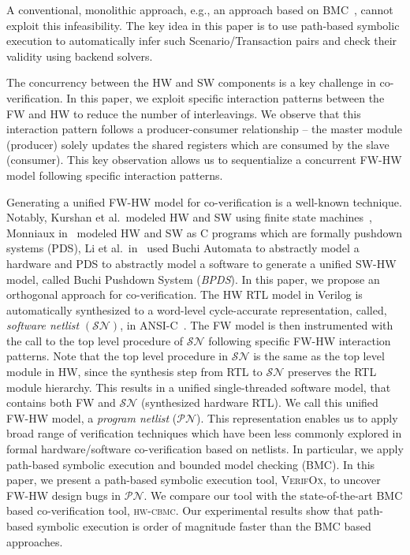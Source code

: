 \documentclass[sigconf]{acmart}
\newcommand{\tool}[1]{\textsc{#1}\xspace}
\newcommand{\hwcbmcv}{\tool{hw-cbmc}}
\newcommand{\verifox}{\tool{VerifOx}}
\newcommand{\Omit}[1]{}
\begin{document}
A conventional, monolithic approach, e.g., an
approach based on BMC~\cite{CKY03}, cannot exploit this infeasibility.  The
key idea in this paper is to use path-based symbolic execution to
automatically infer such Scenario/Transaction pairs and check their validity
using backend solvers.

\Omit{
A system is comprised of a set of concurrent FW and HW transactions which
interleaves asynchronously. It is well recognized that concurrency is at
the heart of co-verification. The number of interleavings between the FW
and HW threads can be large, which can become a bottleneck in the
verification process. }

The concurrency between the HW and SW components is a key challenge in
co-verification.  In this paper, we exploit specific interaction patterns
between the FW and HW to reduce the number of interleavings.  We observe
that this interaction pattern follows a producer-consumer relationship --
the master module (producer) solely updates the shared registers which are
consumed by the slave (consumer).  This key observation allows us to
sequentialize a concurrent FW-HW model following specific interaction
patterns.

Generating a unified FW-HW model for co-verification is a well-known 
technique. Notably, Kurshan et al.~modeled HW and 
SW using finite state machines~\cite{fmsd02}, Monniaux in~\cite{emsoft07} modeled
HW and SW as C programs which are formally pushdown systems (PDS), 
Li et al.~in~\cite{fase10} used Buchi Automata to abstractly
model a hardware and PDS to abstractly model a software to generate a unified SW-HW model, 
called Buchi Pushdown System ({\em BPDS}). In this paper, we propose an 
orthogonal approach for co-verification.  
The HW RTL model in Verilog is automatically synthesized to a 
word-level cycle-accurate representation, called, 
{\em software netlist} $(\mathcal{SN})$, in ANSI-C~\cite{mtk2016}. 
The FW model is then instrumented with the call to the 
top level procedure of $\mathcal{SN}$ following specific FW-HW interaction 
patterns. Note that the top level procedure in $\mathcal{SN}$
is the same as the top level module in HW, since the 
synthesis step from RTL to $\mathcal{SN}$ preserves the 
RTL module hierarchy. This results in a unified single-threaded software model, 
that contains both FW and $\mathcal{SN}$ 
(synthesized hardware RTL). We call this 
unified FW-HW model, a {\em program netlist} (${\mathcal{PN}}$). 
This representation enables us to apply
broad range of verification techniques which have 
been less commonly explored in formal hardware/software 
co-verification based on netlists. In particular, we 
apply path-based symbolic execution and bounded model checking (BMC). 
In this paper, we present a path-based symbolic execution tool, 
\verifox, to uncover FW-HW design bugs in ${\mathcal{PN}}$. 
We compare our tool with the state-of-the-art BMC based 
co-verification tool, \hwcbmcv. Our experimental results show 
that path-based symbolic execution is order of magnitude 
faster than the BMC based approaches. 
\end{document}
